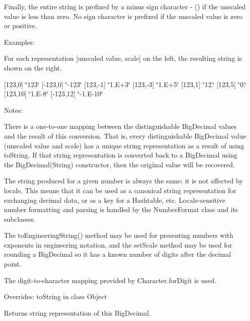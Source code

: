 Finally, the entire string is prefixed by a minus sign character \textquotesingle{}-\/\textquotesingle{} (\textquotesingle{}\textquotesingle{}) if the unscaled value is less than zero. No sign character is prefixed if the unscaled value is zero or positive. 

Examples\+: 

For each representation \mbox{[}unscaled value, scale\mbox{]} on the left, the resulting string is shown on the right. 

\mbox{[}123,0\mbox{]} \char`\"{}123\char`\"{} \mbox{[}-\/123,0\mbox{]} \char`\"{}-\/123\char`\"{} \mbox{[}123,-\/1\mbox{]} \char`\"{}1.\+E+3\char`\"{} \mbox{[}123,-\/3\mbox{]} \char`\"{}1.\+E+5\char`\"{} \mbox{[}123,1\mbox{]} \char`\"{}12.\char`\"{} \mbox{[}123,5\mbox{]} \char`\"{}0.\char`\"{} \mbox{[}123,10\mbox{]} \char`\"{}1.\+E-\/8\char`\"{} \mbox{[}-\/123,12\mbox{]} \char`\"{}-\/1.\+E-\/10\char`\"{} 

Notes\+: 

There is a one-\/to-\/one mapping between the distinguishable Big\+Decimal values and the result of this conversion. That is, every distinguishable Big\+Decimal value (unscaled value and scale) has a unique string representation as a result of using to\+String. If that string representation is converted back to a Big\+Decimal using the Big\+Decimal(\+String) constructor, then the original value will be recovered. 

The string produced for a given number is always the same; it is not affected by locale. This means that it can be used as a canonical string representation for exchanging decimal data, or as a key for a Hashtable, etc. Locale-\/sensitive number formatting and parsing is handled by the Number\+Format class and its subclasses. 

The to\+Engineering\+String() method may be used for presenting numbers with exponents in engineering notation, and the set\+Scale method may be used for rounding a Big\+Decimal so it has a known number of digits after the decimal point. 

The digit-\/to-\/character mapping provided by Character.\+for\+Digit is used. 

Overrides\+: to\+String in class Object

\begin{DoxyReturn}{Returns}
string representation of this Big\+Decimal. 
\end{DoxyReturn}
\mbox{\label{classcom_1_1aarrelaakso_1_1drawl_1_1_sisu_number_a3d8585ae00c288b063998e0c65950333}} 
